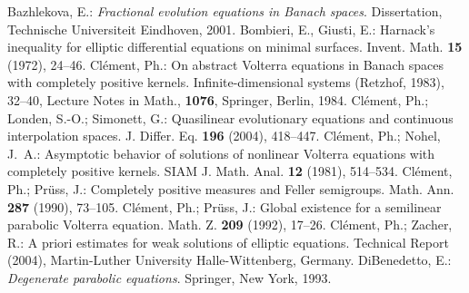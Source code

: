 \documentclass[10pt]{article}
\begin{document}
\begin{thebibliography}{99}
{\footnotesize
 Bazhlekova, E.: {\em Fractional evolution equations in
Banach spaces}. Dissertation, Technische Universiteit Eindhoven,
2001.
 Bombieri, E., Giusti, E.: Harnack's inequality
for elliptic differential equations on minimal surfaces. Invent.
Math. {\bf 15} (1972), 24--46.
 Cl\'{e}ment, Ph.: On abstract Volterra equations in Banach spaces
with completely positive kernels. Infinite-dimensional systems
(Retzhof, 1983), 32--40, Lecture Notes in Math., {\bf 1076},
Springer, Berlin, 1984.
 Cl\'{e}ment, Ph.; Londen, S.-O.; Simonett, G.:
Quasilinear evolutionary equations and continuous interpolation
spaces. J. Differ. Eq. {\bf 196} (2004), 418--447.
 Cl\'{e}ment, Ph.; Nohel, J.\ A.: Asymptotic behavior of
solutions of nonlinear Volterra equations with completely positive
kernels. SIAM J. Math. Anal. {\bf 12} (1981), 514--534.
 Cl\'{e}ment, Ph.; Pr\"uss, J.: Completely positive measures and
Feller semigroups. Math. Ann. {\bf 287} (1990), 73--105.
 Cl\'{e}ment, Ph.; Pr\"uss, J.: Global existence for a
semilinear parabolic Volterra equation. Math. Z. {\bf 209} (1992),
17--26.
 Cl\'{e}ment, Ph.; Zacher, R.: A priori estimates for
weak solutions of elliptic equations. Technical Report (2004),
Martin-Luther University Halle-Wittenberg, Germany.
 DiBenedetto, E.: {\em Degenerate parabolic
equations}. Springer, New York, 1993.
}
\end{thebibliography}
\end{document}
